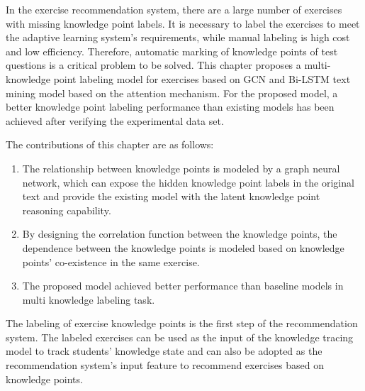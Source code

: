 
In the exercise recommendation system, there are a large number of exercises with missing knowledge point labels. It is necessary to label the exercises to meet the adaptive learning system's requirements, while manual labeling is high cost and low efficiency. Therefore, automatic marking of knowledge points of test questions is a critical problem to be solved. This chapter proposes a multi-knowledge point labeling model for exercises based on GCN and Bi-LSTM text mining model based on the attention mechanism. For the proposed model, a better knowledge point labeling performance than existing models has been achieved after verifying the experimental data set.

The contributions of this chapter are as follows:
\begin{enumerate}
    \item The relationship between knowledge points is modeled by a graph neural network, which can expose the hidden knowledge point labels in the original text and provide the existing model with the latent knowledge point reasoning capability.
    \item By designing the correlation function between the knowledge points, the dependence between the knowledge points is modeled based on knowledge points' co-existence in the same exercise.
    \item The proposed model achieved better performance than baseline models in multi knowledge labeling task.
\end{enumerate}

The labeling of exercise knowledge points is the first step of the recommendation system. The labeled exercises can be used as the input of the knowledge tracing model to track students' knowledge state and can also be adopted as the recommendation system's input feature to recommend exercises based on knowledge points.

